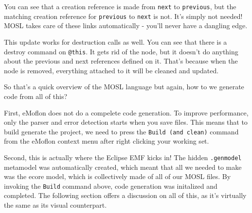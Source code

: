 You can see that a creation reference is made from \texttt{next} to \texttt{previous}, but the matching creation reference for \texttt{previous} to
\texttt{next} is not. It's simply not needed! MOSL takes care of these links automatically - you'll never have a dangling edge.

This update works for destruction calls as well. You can see that there is a destroy command on \texttt{@this}. It gets rid of the node, but it doesn't do
anything about the previous and next references defined on it. That's because when the node is removed, everything attached to it will be cleaned and updated.
 
So that's a quick overview of the MOSL language but again, how to we generate code from all of this?

First, eMoflon does not do a compelete code generation. To improve performance, only the parser and error detection starts when you save files. This means that
to build generate the project, we need to press the \texttt{Build (and clean)} command from the eMoflon context menu after right clicking your working set.


Second, this is actually where the Eclipse EMF kicks in! The hidden \texttt{.genmodel} metamodel was automatically created, which meant that all we needed to
make was the ecore model, which is collectively made of all of our MOSL files. By invoking the \texttt{Build} command above, code generation was initalized and
completed. The following section offers a discussion on all of this, as it's virtually the same as its visual counterpart.
